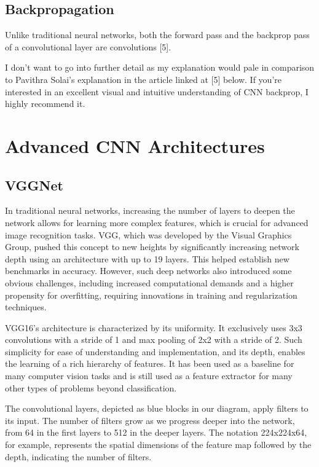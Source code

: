 \documentclass{article}
\begin{document}
    \subsection{Backpropagation}
        Unlike traditional neural networks, both the forward pass and the backprop pass of a convolutional layer are convolutions [5].

        I don't want to go into further detail as my explanation would pale in comparison to Pavithra Solai's explanation in the article linked at [5] below. If you're interested in an excellent visual and intuitive understanding of CNN backprop, I highly recommend it.
        
\section{Advanced CNN Architectures}
    \subsection{VGGNet}
        In traditional neural networks, increasing the number of layers to deepen the network allows for learning more complex features, which is crucial for advanced image recognition tasks. VGG, which was developed by the Visual Graphics Group, pushed this concept to new heights by significantly increasing network depth using an architecture with up to 19 layers. This  helped establish new benchmarks in accuracy. However, such deep networks also introduced some obvious challenges, including increased computational demands and a higher propensity for overfitting, requiring innovations in training and regularization techniques.
        
        VGG16's architecture is characterized by its uniformity. It exclusively uses 3x3 convolutions with a stride of 1 and max pooling of 2x2 with a stride of 2. Such simplicity for ease of understanding and implementation, and its depth, enables the learning of a rich hierarchy of features. It has been used as a baseline for many computer vision tasks and is still used as a feature extractor for many other types of problems beyond classification.

        The convolutional layers, depicted as blue blocks in our diagram, apply filters to its input. The number of filters grow as we progress deeper into the network, from 64 in the first layers to 512 in the deeper layers. The notation 224x224x64, for example, represents the spatial dimensions of the feature map followed by the depth, indicating the number of filters.
\end{document}
